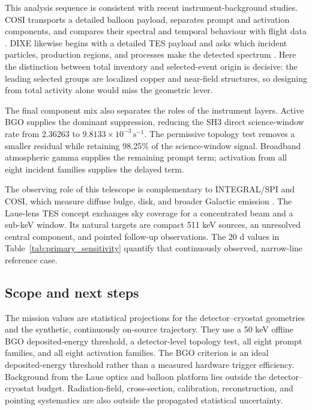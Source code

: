 \documentclass[11pt]{article}
\newcommand{\cps}{\ensuremath{\,\mathrm{s^{-1}}}}
\begin{document}
This analysis sequence is consistent with recent instrument-background studies.
COSI transports a detailed balloon payload, separates prompt and activation
components, and compares their spectral and temporal behaviour with flight data
\cite{Gallego2025Balloon}. DIXE likewise begins with a detailed TES payload and
asks which incident particles, production regions, and processes make the
detected spectrum \cite{Tian2026DIXE}. Here the distinction between total
inventory and selected-event origin is decisive: the leading selected groups are
localized copper and near-field structures, so designing from total activity
alone would miss the geometric lever.

The final component mix also separates the roles of the instrument layers.
Active BGO supplies the dominant suppression, reducing the SH3 direct
science-window rate from 2.36263 to $9.8133\times10^{-3}\cps$. The permissive
topology test removes a smaller residual while retaining 98.25\% of the
science-window signal. Broadband atmospheric gamma supplies the remaining prompt
term; activation from all eight incident families supplies the delayed term.

The observing role of this telescope is complementary to INTEGRAL/SPI and COSI,
which measure diffuse bulge, disk, and broader Galactic emission
\cite{Siegert2016AA,Kierans2020,Siegert2020COSI,Yoneda2025,Karwin2023}. The
Laue-lens TES concept exchanges sky coverage for a concentrated beam and a
sub-keV window. Its natural targets are compact 511 keV sources, an unresolved
central component, and pointed follow-up observations. The 20 d values in
Table~\ref{tab:primary_sensitivity} quantify that continuously observed,
narrow-line reference case.

\subsection{Scope and next steps}
\label{subsec:limitations}

The mission values are statistical projections for the detector--cryostat
geometries and the synthetic, continuously on-source trajectory. They use a
50 keV offline BGO deposited-energy threshold, a detector-level topology test, all eight
prompt families, and all eight activation families. The BGO criterion is an
ideal deposited-energy threshold rather than a measured hardware trigger
efficiency. Background from the Laue optics and balloon platform lies outside the
detector--cryostat budget. Radiation-field, cross-section, calibration,
reconstruction, and pointing systematics are also outside the propagated
statistical uncertainty.
\end{document}
